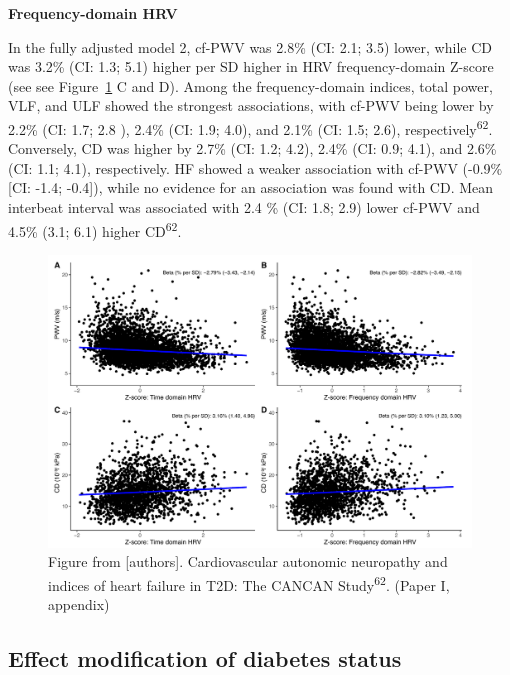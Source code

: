 \documentclass[
  a4paper,
  headsepline=true,
  open=any]{scrbook}
\begin{document}
\textbf{Frequency-domain HRV}

In the fully adjusted model 2, cf-PWV was 2.8\% (CI: 2.1; 3.5) lower,
while CD was 3.2\% (CI: 1.3; 5.1) higher per SD higher in HRV
frequency-domain Z-score (see see Figure~\ref{fig-MS-HRV_overall} C and
D). Among the frequency-domain indices, total power, VLF, and ULF showed
the strongest associations, with cf-PWV being lower by 2.2\% (CI: 1.7;
2.8 ), 2.4\% (CI: 1.9; 4.0), and 2.1\% (CI: 1.5; 2.6),
respectively\textsuperscript{62}. Conversely, CD was higher by 2.7\%
(CI: 1.2; 4.2), 2.4\% (CI: 0.9; 4.1), and 2.6\% (CI: 1.1; 4.1),
respectively. HF showed a weaker association with cf-PWV (-0.9\% {[}CI:
-1.4; -0.4{]}), while no evidence for an association was found with CD.
Mean interbeat interval was associated with 2.4 \% (CI: 1.8; 2.9) lower
cf-PWV and 4.5\% (3.1; 6.1) higher CD\textsuperscript{62}.

\begin{figure}

{\centering \includegraphics{images/figure3_linear_plot.pdf}

}

\caption{\label{fig-MS-HRV_overall}Figure from {[}authors{]}.
Cardiovascular autonomic neuropathy and indices of heart failure in T2D:
The CANCAN Study\textsuperscript{62}. (Paper I, appendix)}

\end{figure}

\hypertarget{effect-modification-of-diabetes-status}{%
\subsection{Effect modification of diabetes
status}\label{effect-modification-of-diabetes-status}}
\end{document}
